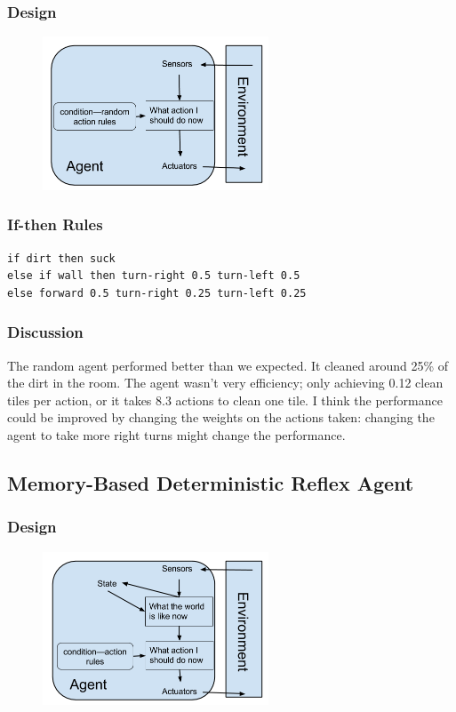\documentclass[a4paper,10pt]{article}
\begin{document}
\subsubsection{Design}
\begin{figure}[H]
	\begin{center}
		\includegraphics[width=0.6\textwidth]{RandomReflex.png}
	\end{center}
\end{figure}
\subsubsection{If-then Rules}
\begin{verbatim}
if dirt then suck
else if wall then turn-right 0.5 turn-left 0.5
else forward 0.5 turn-right 0.25 turn-left 0.25
\end{verbatim}

\subsubsection{Discussion}
The random agent performed better than we expected. It cleaned around 25\% of the dirt in the room. The agent wasn't very efficiency; only achieving 0.12 clean tiles per action, or it takes 8.3 actions to clean one tile. I think the performance could be improved by changing the weights on the actions taken: changing the agent to take more right turns might change the performance.


\subsection{Memory-Based Deterministic Reflex Agent}
\subsubsection{Design}
\begin{figure}[H]
	\begin{center}
		\includegraphics[width=0.6\textwidth]{MemoryReflex.png}
	\end{center}
\end{figure}
\end{document}
